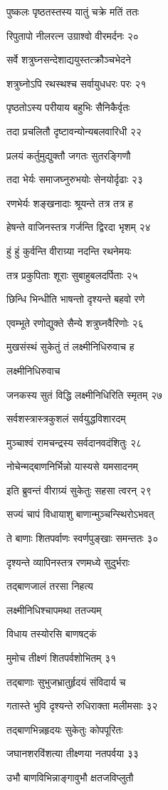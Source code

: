पुष्कलः पृष्ठतस्तस्य यातुं चक्रे मतिं ततः

रिपुतापो नीलरत्न उग्राश्वो वीरमर्दनः २०

सर्वे शत्रुघ्नसन्देशाद्ययुस्तत्क्रौञ्चभेदने

शत्रुघ्नोऽपि रथस्थश्च सर्वायुधधरः परः २१

पृष्ठतोऽस्य परीयाय बहुभिः सैनिकैर्वृतः

तदा प्रचलितौ दृष्टावन्योन्यबलवारिधी २२

प्रलयं कर्तुमुद्युक्तौ जगतः सुतरङ्गिणौ

तदा भेर्यः समाजघ्नुरुभयोः सेनयोर्दृढाः २३

रणभेर्यः शङ्खनादाः श्रूयन्ते तत्र तत्र ह

हेषन्ते वाजिनस्तत्र गर्जन्ति द्विरदा भृशम् २४

हुं हुं कुर्वन्ति वीराग्र्या नदन्ति रथनेमयः

तत्र प्रकुपिताः शूराः सुबाहुबलदर्पिताः २५

छिन्धि भिन्धीति भाषन्तो दृश्यन्ते बहवो रणे

एवम्भूते रणोद्युक्ते सैन्ये शत्रुघ्नवैरिणोः २६

मुखसंस्थं सुकेतुं तं लक्ष्मीनिधिरुवाच ह

लक्ष्मीनिधिरुवाच

जनकस्य सुतं विद्धि लक्ष्मीनिधिरिति स्मृतम् २७

सर्वशस्त्रास्त्रकुशलं सर्वयुद्धविशारदम्

मुञ्चाश्वं रामचन्द्रस्य सर्वदानवदंशितुः २८

नोचेन्मद्बाणनिर्भिन्नो यास्यसे यमसादनम्

इति ब्रुवन्तं वीराग्र्यं सुकेतुः सहसा त्वरन् २९

सज्यं चापं विधायाशु बाणान्मुञ्चन्स्थिरोऽभवत्

ते बाणाः शितपर्वाणः स्वर्णपुङ्खाः समन्ततः ३०

दृश्यन्ते व्यापिनस्तत्र रणमध्ये सुदुर्भराः

तद्बाणजालं तरसा निहत्य

लक्ष्मीनिधिश्चापमथा ततज्यम्

विधाय तस्योरसि बाणषट्कं

मुमोच तीक्ष्णं शितपर्वशोभितम् ३१

तद्बाणाः सुभुजभ्रातुर्हृदयं संविदार्य च

गतास्ते भुवि दृश्यन्ते रुधिराक्ता मलीमसाः ३२

तद्बाणभिन्नहृदयः सुकेतुः कोपपूरितः

जघानशरविंशत्या तीक्ष्णया नतपर्वया ३३

उभौ बाणविभिन्नाङ्गावुभौ क्षतजविप्लुतौ

